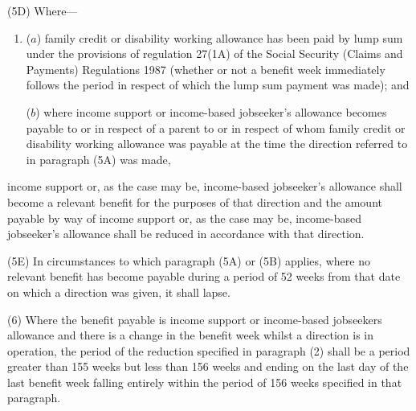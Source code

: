 \documentclass[a4paper,12pt]{article}
\begin{document}
(5D) Where—
\begin{enumerate}\item[]
($a$) family credit or disability working allowance has been paid by lump sum under the provisions of regulation 27(1A) of the Social Security (Claims and Payments) Regulations 1987 (whether or not a benefit week immediately follows the period in respect of which the lump sum payment was made); and

($b$) where income support 
or income-based jobseeker’s allowance  %
becomes payable to or in respect of a parent to or in respect of whom family credit or disability working allowance was payable at the time the direction referred to in paragraph (5A) was made, 
\end{enumerate}
income support 
or, as the case may be, income-based jobseeker’s allowance  %
shall become a relevant benefit for the purposes of that direction and the amount payable by way of income support 
or, as the case may be, income-based jobseeker’s allowance  %
shall be reduced in accordance with that direction.

(5E) In circumstances to which paragraph (5A) or (5B) applies, where no relevant benefit has become payable during a period of 52 weeks from that date on which a direction was given, it shall lapse.

%

(6) Where the benefit payable is income support or income-based jobseekers allowance and there is a change in the benefit week whilst a direction is in operation, the period of the reduction specified in paragraph (2) shall be a period greater than 155 weeks but less than 156 weeks and ending on the last day of the last benefit week falling entirely within the period of 156 weeks specified in that paragraph.
\end{document}
